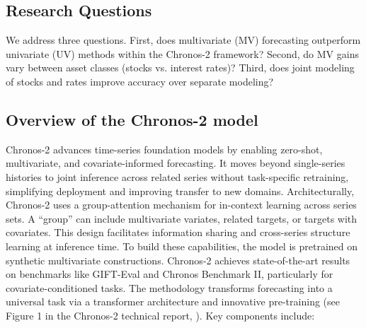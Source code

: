 \documentclass[twocolumn]{article}
\begin{document}
\subsection{Research Questions}

We address three questions. First, does multivariate (MV) forecasting outperform univariate (UV) methods within the Chronos-2 framework? Second, do MV gains vary between asset classes (stocks vs. interest rates)? Third, does joint modeling of stocks and rates improve accuracy over separate modeling?

\subsection{Overview of the Chronos-2 model}

Chronos-2 advances time-series foundation models by enabling zero-shot, multivariate, and covariate-informed forecasting. It moves beyond single-series histories to joint inference across related series without task-specific retraining, simplifying deployment and improving transfer to new domains. Architecturally, Chronos-2 uses a group-attention mechanism for in-context learning across series sets. A ``group'' can include multivariate variates, related targets, or targets with covariates. This design facilitates information sharing and cross-series structure learning at inference time. To build these capabilities, the model is pretrained on synthetic multivariate constructions. Chronos-2 achieves state-of-the-art results on benchmarks like GIFT-Eval and Chronos Benchmark II, particularly for covariate-conditioned tasks. The methodology transforms forecasting into a universal task via a transformer architecture and innovative pre-training (see Figure 1 in the Chronos-2 technical report, \citep{ansari_chronos-2_2025}). Key components include:
\end{document}
